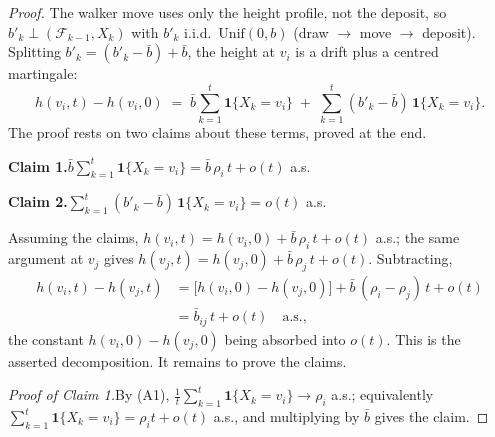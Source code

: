 \documentclass[11pt]{article}
\theoremstyle{definition}
\begin{document}
\begin{proof}
The walker move uses only the height profile, not the deposit, so $b'_k \perp (\mathcal{F}_{k-1}, X_k)$ with $b'_k$ i.i.d.\ $\mathrm{Unif}(0, b)$ (draw $\to$ move $\to$ deposit). Splitting $b'_k = (b'_k - \bar b) + \bar b$, the height at $v_i$ is a drift plus a centred martingale:
\[
h(v_i, t) - h(v_i, 0) \;=\; \bar b \sum_{k=1}^{t} \mathbf{1}\{X_k = v_i\} \;+\; \sum_{k=1}^{t} (b'_k - \bar b)\,\mathbf{1}\{X_k = v_i\} .
\]
The proof rests on two claims about these terms, proved at the end.

\smallskip\noindent\textbf{Claim 1.}\quad $\bar b \sum_{k=1}^{t}\mathbf{1}\{X_k = v_i\} = \bar b\,\rho_i\,t + o(t)$ a.s.

\smallskip\noindent\textbf{Claim 2.}\quad $\sum_{k=1}^{t} (b'_k - \bar b)\,\mathbf{1}\{X_k = v_i\} = o(t)$ a.s.

\smallskip\noindent
Assuming the claims, $h(v_i, t) = h(v_i, 0) + \bar b\,\rho_i\,t + o(t)$ a.s.; the same argument at $v_j$ gives $h(v_j, t) = h(v_j, 0) + \bar b\,\rho_j\,t + o(t)$. Subtracting,
\begin{align*}
h(v_i, t) - h(v_j, t)
&= \bigl[h(v_i, 0) - h(v_j, 0)\bigr] + \bar b\,(\rho_i - \rho_j)\,t + o(t) \\
&= \bar{b}_{ij}\,t + o(t) \quad \text{a.s.},
\end{align*}
the constant $h(v_i, 0) - h(v_j, 0)$ being absorbed into $o(t)$. This is the asserted decomposition. It remains to prove the claims.

\medskip\noindent\textit{Proof of Claim 1.}\quad By (A1), $\tfrac{1}{t}\sum_{k=1}^{t}\mathbf{1}\{X_k = v_i\} \to \rho_i$ a.s.; equivalently $\sum_{k=1}^{t}\mathbf{1}\{X_k = v_i\} = \rho_i t + o(t)$ a.s., and multiplying by $\bar b$ gives the claim.


\end{proof}
\end{document}
